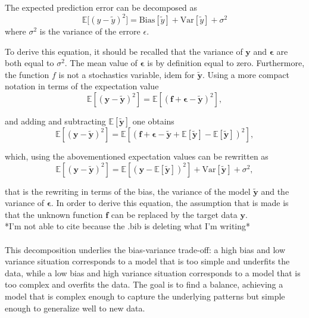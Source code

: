 \documentclass[
 reprint,            %
 amsmath,amssymb,
 aps,
]{revtex4-2}
\begin{document}
The expected prediction error can be decomposed as
$$\mathbb{E}[(y - \tilde y)^2\big] = \mathrm{Bias}[\tilde y] + \mathrm{Var}[\tilde y] + \sigma^2$$
where $\sigma ^2$ is the variance of the errore $\epsilon$. 

To derive this equation, it should be recalled that the variance of $\boldsymbol{y}$ and $\boldsymbol{\epsilon}$ are both equal to $\sigma^2$. The mean value of $\boldsymbol{\epsilon}$ is by definition equal to zero. Furthermore, the function $f$ is not a stochastics variable, idem for $\boldsymbol{\tilde{y}}$.
Using a more compact notation in terms of the expectation value
$$
\mathbb{E}\left[(\boldsymbol{y}-\boldsymbol{\tilde{y}})^2\right]=\mathbb{E}\left[(\boldsymbol{f}+\boldsymbol{\epsilon}-\boldsymbol{\tilde{y}})^2\right],
$$

and adding and subtracting $\mathbb{E}\left[\boldsymbol{\tilde{y}}\right]$ one obtains 
$$
\mathbb{E}\left[(\boldsymbol{y}-\boldsymbol{\tilde{y}})^2\right]=\mathbb{E}\left[(\boldsymbol{f}+\boldsymbol{\epsilon}-\boldsymbol{\tilde{y}}+\mathbb{E}\left[\boldsymbol{\tilde{y}}\right]-\mathbb{E}\left[\boldsymbol{\tilde{y}}\right])^2\right],
$$

which, using the abovementioned expectation values can be rewritten as
$$
\mathbb{E}\left[(\boldsymbol{y}-\boldsymbol{\tilde{y}})^2\right]=\mathbb{E}\left[(\boldsymbol{y}-\mathbb{E}\left[\boldsymbol{\tilde{y}}\right])^2\right]+\mathrm{Var}\left[\boldsymbol{\tilde{y}}\right]+\sigma^2,
$$

that is the rewriting in terms of the bias, the variance of the model $\boldsymbol{\tilde{y}}$ and the variance of $\boldsymbol{\epsilon}$. \cite{misc} 
In order to derive this equation, the assumption that is made is that the unknown function $\boldsymbol{f}$ can be replaced by the target data $\boldsymbol{y}$.\\
*I'm not able to cite because the .bib is deleting what I'm writing* \\\\ 
This decomposition underlies the bias-variance trade-off: a high bias and low variance situation corresponds to a model that is too simple and underfits the data, while a low bias and high variance situation corresponds to a model that is too complex and overfits the data.
The goal is to find a balance, achieving a model that is complex enough to capture the underlying patterns but simple enough to generalize well to new data.\\\\
\end{document}
